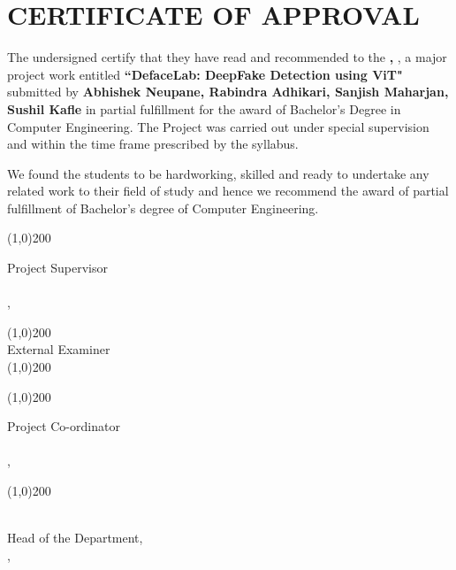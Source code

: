 \section*{CERTIFICATE OF APPROVAL}


The undersigned certify that they have read and recommended to the \textbf{\thedepartment,  \thecampus}, a major
project work entitled \textbf{“DefaceLab:  DeepFake Detection using ViT"} submitted by \textbf{Abhishek Neupane, Rabindra Adhikari, Sanjish Maharjan, Sushil Kafle} in partial fulfillment for the award of Bachelor’s
Degree in Computer Engineering. The Project was carried out
under special supervision and within the time frame prescribed by the syllabus.

\vspace{1cm}

\noindent We found the students to be hardworking, skilled and ready to undertake any related
work to their field of study and hence we recommend the award of partial fulfillment
of Bachelor’s degree of Computer Engineering.

\vspace{1cm}

\noindent \line(1,0){200}

\noindent Project Supervisor \\
\thesupervisor \\
\thedepartment, \thecampus


\vspace{1cm}
\noindent \line(1,0){200}\\
\noindent External Examiner \\
\noindent \line(1,0){200}\\
\vspace{1cm}

\noindent \line(1,0){200}

\noindent Project Co-ordinator \\
\theprogramcoordinator \\
\thedepartment, \thecampus

\vspace{1cm}

\noindent \line(1,0){200}

\noindent \theHOD \\
Head of the Department, \\
\thedepartment, \thecampus

\vspace{1cm}

\noindent \thedate
